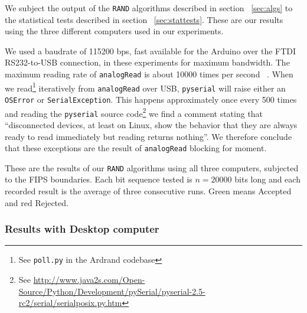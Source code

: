 \documentclass[a4paper]{article}           %
\begin{document}
We subject the output of the \texttt{RAND} algorithms described in section ~\ref{sec:algs} to the statistical tests described in section ~\ref{sec:stattests}. These are our results using the three different computers used in our experiments. 

We used a baudrate of 115200 bps, fast available for the Arduino over the FTDI RS232-to-USB connection, in these experiments for maximum bandwidth. The maximum reading rate of \texttt{analogRead} is about 10000 times per second ~\cite{ardref}. When we read\footnote{See \texttt{poll.py} in the Ardrand codebase} iteratively from \texttt{analogRead} over USB,  \texttt{pyserial} will raise either an \texttt{OSError} or \texttt{SerialException}. This happens approximately once every 500 times and reading the \texttt{pyserial} source code\footnote{See \url{http://www.java2s.com/Open-Source/Python/Development/pySerial/pyserial-2.5-rc2/serial/serialposix.py.htm}} we find a comment stating that ``disconnected devices, at least on Linux, show the behavior that they are always ready to read immediately but reading returns nothing''. We therefore conclude that these exceptions are the result of \texttt{analogRead} blocking for moment. 

These are the results of our \texttt{RAND} algorithms using all three computers, subjected to the FIPS boundaries. Each bit sequence tested is $n = 20000$ bits long and each recorded result is the average of three consecutive runs. Green means Accepted and red Rejected. 

\subsubsection{Results with Desktop computer}
\end{document}
